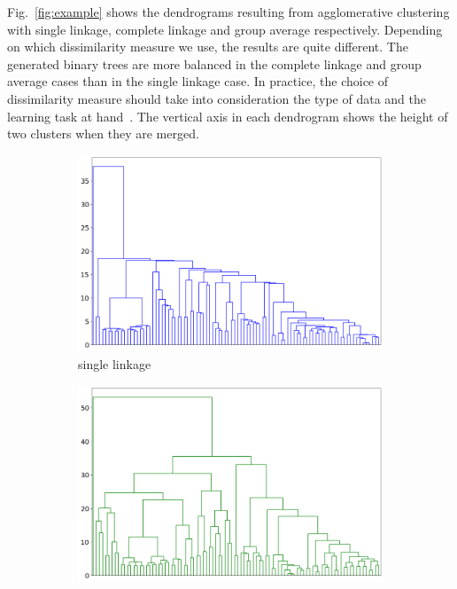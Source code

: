 Fig.~\ref{fig:example} shows the dendrograms resulting from agglomerative clustering with single linkage, complete linkage and group average respectively. Depending on which dissimilarity measure we use, the results are quite different. The generated binary trees are more balanced in the complete linkage and group average cases than in the single linkage case. In practice, the choice of dissimilarity measure should take into consideration the type of data and the learning task at hand~\cite{James2013}. The vertical axis in each dendrogram shows the height of two clusters when they are merged. 

\begin{figure}[htp]
  \centering
  \begin{subfigure}[b]{0.8\linewidth}
    \includegraphics[width=\linewidth]{"Part 3 - Learning Systems/Unsupervised Learning/Hierarchical Clustering/figures/Agglomerative-Single.png"}
    \caption{single linkage}
  \end{subfigure}
  \begin{subfigure}[b]{0.8\linewidth}
    \includegraphics[width=\linewidth]{"Part 3 - Learning Systems/Unsupervised Learning/Hierarchical Clustering/figures/Agglomerative-Complete.png"}

\end{subfigure}
\end{figure}
